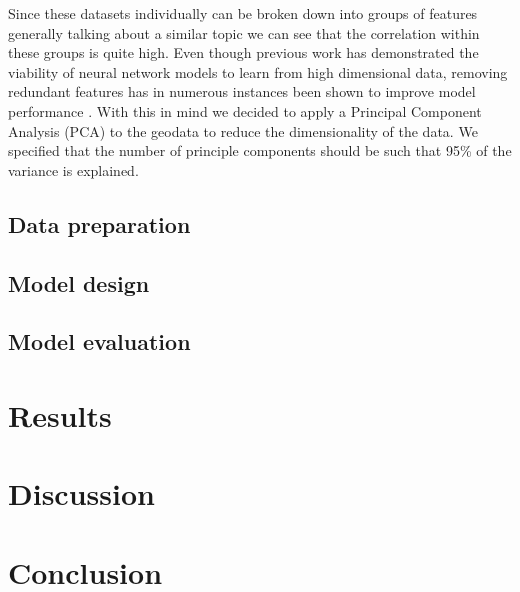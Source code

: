 \documentclass[12pt,a4paper,oneside]{article}
\begin{document}
Since these datasets individually can be broken down into groups of features generally talking about a similar topic we can see that the correlation within these groups is quite high. Even though previous work \cite{DBLP:journals/corr/abs-2007-00062} has demonstrated the viability of neural network models to learn from high dimensional data, removing redundant features has in numerous instances been shown to improve model performance \cite{chen2022survey}. With this in mind we decided to apply a Principal Component Analysis (PCA) to the geodata to reduce the dimensionality of the data. We specified that the number of principle components should be such that 95\% of the variance is explained.   

\subsection{Data preparation}

\subsection{Model design}

\subsection{Model evaluation}

\section{Results}

\section{Discussion}

\section{Conclusion}

\printbibliography
\end{document}
